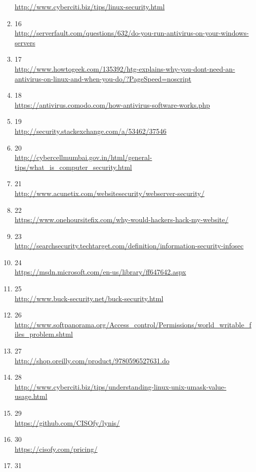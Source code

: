 \documentclass[a4paper,12pt]{article}
\begin{document}
\begin{sloppypar}
\begin{enumerate}
	\url{http://www.cyberciti.biz/tips/linux-security.html}
\item 16 \\
	\url{http://serverfault.com/questions/632/do-you-run-antivirus-on-your-windows-servers}
\item 17 \\
	\url{http://www.howtogeek.com/135392/htg-explains-why-you-dont-need-an-antivirus-on-linux-and-when-you-do/?PageSpeed=noscript}
\item 18 \\
	\url{https://antivirus.comodo.com/how-antivirus-software-works.php}
\item 19 \\
	\url{http://security.stackexchange.com/a/53462/37546}
\item 20 \\
	\url{http://cybercellmumbai.gov.in/html/general-tips/what\_is\_computer\_security.html}
\item 21 \\
	\url{http://www.acunetix.com/websitesecurity/webserver-security/}
\item 22 \\
	\url{https://www.onehoursitefix.com/why-would-hackers-hack-my-website/}
\item 23 \\
	\url{http://searchsecurity.techtarget.com/definition/information-security-infosec}
\item 24 \\
	\url{https://msdn.microsoft.com/en-us/library/ff647642.aspx}
\item 25 \\
	\url{http://www.buck-security.net/buck-security.html}
\item 26 \\
	\url{http://www.softpanorama.org/Access\_control/Permissions/world\_writable\_files\_problem.shtml}
\item 27 \\
	\url{http://shop.oreilly.com/product/9780596527631.do}
\item 28 \\
	\url{http://www.cyberciti.biz/tips/understanding-linux-unix-umask-value-usage.html}
\item 29 \\
	\url{https://github.com/CISOfy/lynis/}
\item 30 \\
	\url{https://cisofy.com/pricing/}
\item 31 \\

\end{enumerate}
\end{sloppypar}
\end{document}
